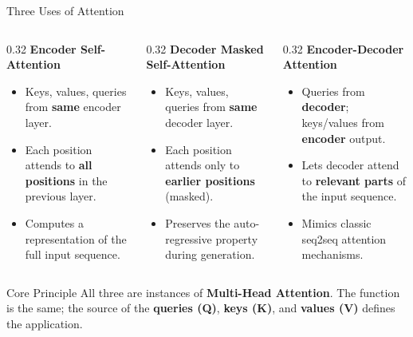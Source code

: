 \documentclass[
	11pt,
	aspectratio=169,
]{beamer}
\begin{document}
\begin{frame}{Three Uses of Attention}
    \begin{footnotesize}
\begin{columns}[T,onlytextwidth]
    \begin{column}{0.32\textwidth}
        \textbf{Encoder Self-Attention}
        \begin{itemize}
            \item Keys, values, queries from \textbf{same} encoder layer.
            \item Each position attends to \textbf{all positions} in the previous layer.
            \item Computes a representation of the full input sequence.
        \end{itemize}
    \end{column}
    \begin{column}{0.32\textwidth}
        \textbf{Decoder Masked Self-Attention}
        \begin{itemize}
            \item Keys, values, queries from \textbf{same} decoder layer.
            \item Each position attends only to \textbf{earlier positions} (masked).
            \item Preserves the auto-regressive property during generation.
        \end{itemize}
    \end{column}
    \begin{column}{0.32\textwidth}
        \textbf{Encoder-Decoder Attention}
        \begin{itemize}
            \item Queries from \textbf{decoder}; keys/values from \textbf{encoder} output.
            \item Lets decoder attend to \textbf{relevant parts} of the input sequence.
            \item Mimics classic seq2seq attention mechanisms.
        \end{itemize}
    \end{column}
\end{columns}
\end{footnotesize}

\begin{block}{Core Principle}
All three are instances of \textbf{Multi-Head Attention}. The function is the same; the source of the \textbf{queries (Q)}, \textbf{keys (K)}, and \textbf{values (V)} defines the application.
\end{block}
\end{frame}
\end{document}
